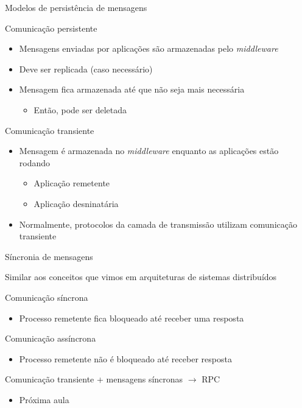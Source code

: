 \documentclass[compress]{beamer}
\begin{document}

\begin{frame}{Modelos de persistência de mensagens}

Comunicação persistente
\begin{itemize}
    \item Mensagens enviadas por aplicações são armazenadas pelo \textit{middleware}
    \item Deve ser replicada (caso necessário)
    \item Mensagem fica armazenada até que não seja mais necessária
    \begin{itemize}
        \item Então, pode ser deletada
    \end{itemize}
\end{itemize}

Comunicação transiente
\begin{itemize}
    \item Mensagem é armazenada no \textit{middleware} enquanto as aplicações estão rodando
    \begin{itemize}
        \item Aplicação remetente
        \item Aplicação desninatária
    \end{itemize}
    \item Normalmente, protocolos da camada de transmissão utilizam comunicação transiente
\end{itemize}
\end{frame}


\begin{frame}{Síncronia de mensagens}

Similar aos conceitos que vimos em arquiteturas de sistemas distribuídos

\vspace{0.5cm}

Comunicação síncrona
\begin{itemize}
    \item Processo remetente fica bloqueado até receber uma resposta
\end{itemize}

\vspace{0.5cm}
Comunicação assíncrona
\begin{itemize}
    \item Processo remetente não é bloqueado até receber resposta
\end{itemize}

\vspace{0.5cm}

Comunicação transiente + mensagens síncronas \textcolor{sthlmDarkBlue}{$\rightarrow$} RPC
\begin{itemize}
    \item Próxima aula
\end{itemize}
\end{frame}
\end{document}
